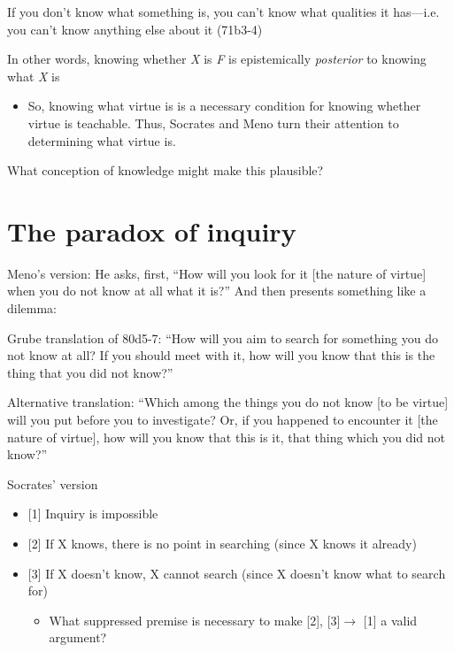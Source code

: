 \documentclass[11pt]{article}
\begin{document}
\noindent If you don't know what something is, you can't know what qualities it has---i.e. you can't know anything else about it (71b3-4)
\vspace*{2mm}

\noindent In other words, knowing whether \emph{X} is \emph{F} is epistemically \emph{posterior} to knowing what \emph{X} is

\begin{itemize}\item{So, knowing what virtue is is a necessary condition for knowing whether virtue is teachable. Thus, Socrates and Meno turn their attention to determining what virtue is.}\end{itemize}

\noindent What conception of knowledge might make this plausible?

\section*{The paradox of inquiry}

\noindent Meno's version: He asks, first, ``How will you look for it [the nature of virtue] when you do not know at all what it is?'' And then presents something like a dilemma:
\vspace*{2mm}

\noindent Grube translation of 80d5-7: ``How will you aim to search for something you do not know at all? If you should meet with it, how will you know that this is the thing that you did not know?''
\vspace*{2mm}

\noindent Alternative translation: ``Which among the things you do not know [to be virtue] will you put before you to investigate? Or, if you happened to encounter it [the nature of virtue], how will you know that this is it, that thing which you did not know?''
\vspace*{2mm}

\noindent Socrates' version
\begin{itemize}\item{[1] Inquiry is impossible}\item{[2] If X knows, there is no point in searching (since X knows it already)}\item{[3] If X doesn't know, X cannot search (since X doesn't know what to search for)}\begin{itemize}\item{What suppressed premise is necessary to make [2], [3]$\rightarrow$ [1] a valid argument?}\end{itemize}\end{itemize}
\end{document}
